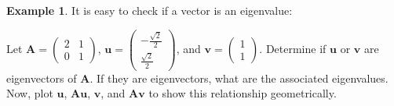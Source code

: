 \documentclass[
]{book}
\theoremstyle{definition}
\theoremstyle{definition}
\newtheorem{example}{Example}[chapter]
\theoremstyle{definition}
\theoremstyle{definition}
\theoremstyle{remark}
\begin{document}
\begin{example}
It is easy to check if a vector is an eigenvalue:

Let \(\mathbf{A} = \begin{pmatrix} 2 & 1 \\ 0 & 1 \end{pmatrix}\), \(\mathbf{u} = \begin{pmatrix} - \frac{\sqrt{2}}{2} \\ \frac{\sqrt{2}}{2} \end{pmatrix}\), and \(\mathbf{v} = \begin{pmatrix} 1 \\ 1 \end{pmatrix}\). Determine if \(\mathbf{u}\) or \(\mathbf{v}\) are eigenvectors of \(\mathbf{A}\). If they are eigenvectors, what are the associated eigenvalues. Now, plot \(\mathbf{u}\), \(\mathbf{A} \mathbf{u}\), \(\mathbf{v}\), and \(\mathbf{A} \mathbf{v}\) to show this relationship geometrically.
\end{example}
\end{document}
